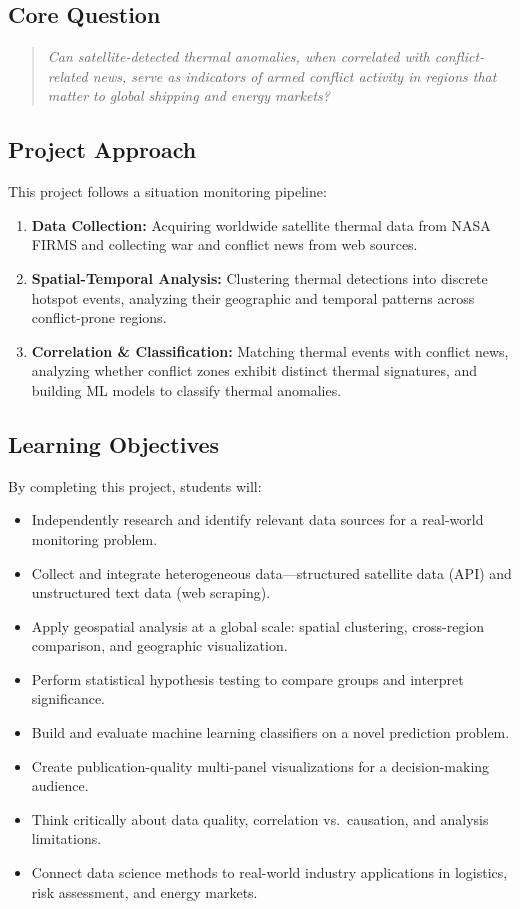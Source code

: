 \documentclass[11pt]{article}
\begin{document}
\subsection{Core Question}
\begin{quote}
\itshape Can satellite-detected thermal anomalies, when correlated with conflict-related news, serve as indicators of armed conflict activity in regions that matter to global shipping and energy markets?
\end{quote}

\subsection{Project Approach}
This project follows a situation monitoring pipeline:
\begin{enumerate}
  \item \textbf{Data Collection:} Acquiring worldwide satellite thermal data from NASA FIRMS and collecting war and conflict news from web sources.
  \item \textbf{Spatial-Temporal Analysis:} Clustering thermal detections into discrete hotspot events, analyzing their geographic and temporal patterns across conflict-prone regions.
  \item \textbf{Correlation \& Classification:} Matching thermal events with conflict news, analyzing whether conflict zones exhibit distinct thermal signatures, and building ML models to classify thermal anomalies.
\end{enumerate}

\subsection{Learning Objectives}
By completing this project, students will:
\begin{itemize}
  \item Independently research and identify relevant data sources for a real-world monitoring problem.
  \item Collect and integrate heterogeneous data---structured satellite data (API) and unstructured text data (web scraping).
  \item Apply geospatial analysis at a global scale: spatial clustering, cross-region comparison, and geographic visualization.
  \item Perform statistical hypothesis testing to compare groups and interpret significance.
  \item Build and evaluate machine learning classifiers on a novel prediction problem.
  \item Create publication-quality multi-panel visualizations for a decision-making audience.
  \item Think critically about data quality, correlation vs.\ causation, and analysis limitations.
  \item Connect data science methods to real-world industry applications in logistics, risk assessment, and energy markets.
\end{itemize}
\end{document}
